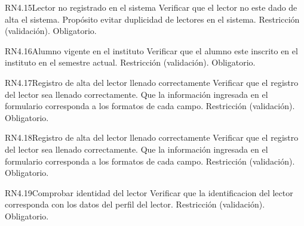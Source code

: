 
\begin{BussinesRule}{RN4.15}{Lector no registrado en el sistema} 
	\BRitem[Descripción:] Verificar que el lector no este dado de alta el sistema. Propósito evitar duplicidad de lectores en el sistema.
	\BRitem[Tipo:] Restricción (validación).
	\BRitem[Nivel:] Obligatorio.
\end{BussinesRule}


\begin{BussinesRule}{RN4.16}{Alumno vigente en el instituto} 
	\BRitem[Descripción:] Verificar que el alumno este inscrito en el instituto en el semestre actual.
	\BRitem[Tipo:] Restricción (validación).
	\BRitem[Nivel:] Obligatorio.
\end{BussinesRule}


\begin{BussinesRule}{RN4.17}{Registro de alta del lector llenado correctamente } 
	\BRitem[Descripción:] Verificar que el registro del lector sea llenado correctamente. Que la información ingresada en el formulario corresponda a los formatos de cada campo.
	\BRitem[Tipo:] Restricción (validación).
	\BRitem[Nivel:] Obligatorio.
\end{BussinesRule}


\begin{BussinesRule}{RN4.18}{Registro de alta del lector llenado correctamente } 
	\BRitem[Descripción:] Verificar que el registro del lector sea llenado correctamente. Que la información ingresada en el formulario corresponda a los formatos de cada campo.
	\BRitem[Tipo:] Restricción (validación).
	\BRitem[Nivel:] Obligatorio.
\end{BussinesRule}


\begin{BussinesRule}{RN4.19}{Comprobar identidad del lector } 
	\BRitem[Descripción:] Verificar que la identificacion del lector corresponda con los datos del perfil del lector.
	\BRitem[Tipo:] Restricción (validación).
	\BRitem[Nivel:] Obligatorio.
\end{BussinesRule}

